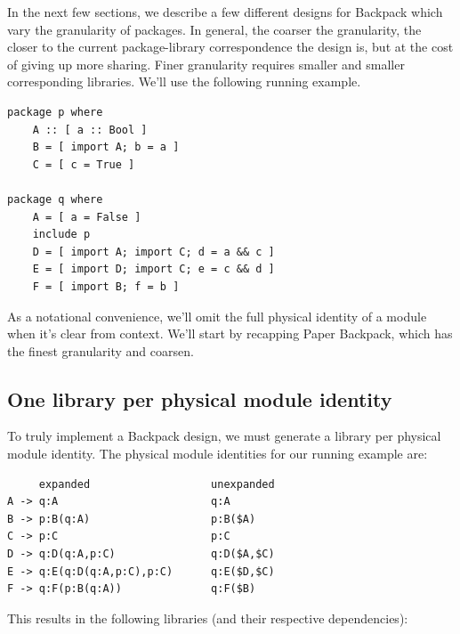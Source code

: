 \documentclass{article}
\begin{document}
In the next few sections, we describe a few different designs for Backpack which
vary the granularity of packages.  In general, the coarser the granularity,
the closer to the current package-library correspondence the design is, but
at the cost of giving up more sharing.  Finer granularity requires smaller
and smaller corresponding libraries.  We'll use the following running example.

\begin{verbatim}
package p where
    A :: [ a :: Bool ]
    B = [ import A; b = a ]
    C = [ c = True ]

package q where
    A = [ a = False ]
    include p
    D = [ import A; import C; d = a && c ]
    E = [ import D; import C; e = c && d ]
    F = [ import B; f = b ]
\end{verbatim}

As a notational convenience, we'll omit the full physical identity of a
module when it's clear from context.  We'll start by recapping Paper Backpack,
which has the finest granularity and coarsen.

\subsection{One library per physical module identity}

To truly implement a Backpack design, we must generate a library per
physical module identity.  The physical module identities for
our running example are:

\begin{verbatim}
     expanded                   unexpanded
A -> q:A                        q:A
B -> p:B(q:A)                   p:B($A)
C -> p:C                        p:C
D -> q:D(q:A,p:C)               q:D($A,$C)
E -> q:E(q:D(q:A,p:C),p:C)      q:E($D,$C)
F -> q:F(p:B(q:A))              q:F($B)
\end{verbatim}

This results in the following
libraries (and their respective dependencies): \\

\end{document}
